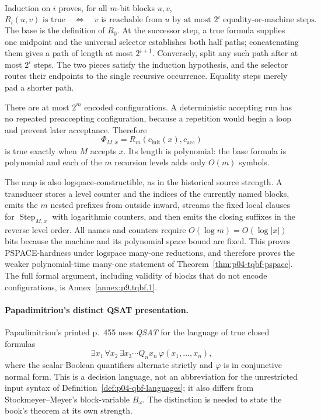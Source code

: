 Induction on \(i\) proves, for all \(m\)-bit blocks \(u,v\),
\[
 R_i(u,v)\text{ is true}
 \quad\Longleftrightarrow\quad
 v\text{ is reachable from }u\text{ by at most }2^i
 \text{ equality-or-machine steps}.
\]
The base is the definition of \(R_0\).  At the successor step, a true formula
supplies one midpoint and the universal selector establishes both half paths;
concatenating them gives a path of length at most \(2^{i+1}\).  Conversely,
split any such path after at most \(2^i\) steps.  The two pieces satisfy the
induction hypothesis, and the selector routes their endpoints to the single
recursive occurrence.  Equality steps merely pad a shorter path.

There are at most \(2^m\) encoded configurations.  A deterministic accepting
run has no repeated preaccepting configuration, because a repetition would
begin a loop and prevent later acceptance.  Therefore
\[
 \Phi_{M,x}=R_m(c_{\mathrm{init}}(x),c_{\mathrm{acc}})
\]
is true exactly when \(M\) accepts \(x\).  Its length is polynomial: the base
formula is polynomial and each of the \(m\) recursion levels adds only
\(O(m)\) symbols.

The map is also logspace-constructible, as in the historical source strength.
A transducer stores a level counter and the indices of the currently named
blocks, emits the \(m\) nested prefixes from outside inward, streams the fixed
local clauses for \(\operatorname{Step}_{M,x}\) with logarithmic counters, and
then emits the closing suffixes in the reverse level order.  All names and
counters require \(O(\log m)=O(\log|x|)\) bits because the machine and its
polynomial space bound are fixed.  This proves PSPACE-hardness under logspace
many-one reductions, and therefore proves the weaker polynomial-time
many-one statement of Theorem~\ref{thm:p04-tqbf-pspace}.  The full formal
argument, including validity of blocks that do not encode configurations, is
Annex~\ref{annex:p9.tqbf.1}.

\paragraph{Papadimitriou's distinct QSAT presentation.}
Papadimitriou's printed p.~455 uses \emph{QSAT} for the language of true closed
formulas
\[
 \exists x_1\,\forall x_2\,\exists x_3\cdots Q_n x_n\,
 \varphi(x_1,\ldots,x_n),
\]
where the scalar Boolean quantifiers alternate strictly and \(\varphi\) is in
conjunctive normal form.  This is a decision language, not an abbreviation for
the unrestricted input syntax of Definition~\ref{def:p04-qbf-languages}; it
also differs from Stockmeyer--Meyer's block-variable \(B_\omega\).  The
distinction is needed to state the book's theorem at its own strength.


